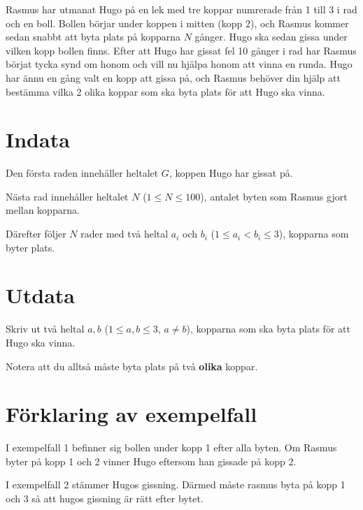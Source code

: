 
Rasmus har utmanat Hugo på en lek med tre koppar numrerade från 1 till 3 i rad och en boll. Bollen börjar under koppen i
mitten (kopp 2), och Rasmus kommer sedan snabbt att byta plats på kopparna $N$ gånger.
Hugo ska sedan gissa under vilken kopp bollen finns. Efter att Hugo har gissat fel 10 gånger i rad
har Rasmus börjat tycka synd om honom och vill nu hjälpa honom att vinna en runda.
Hugo har ännu en gång valt en kopp att gissa på, och Rasmus behöver din hjälp att bestämma vilka
2 olika koppar som ska byta plats för att Hugo ska vinna.

\section*{Indata}
Den första raden innehåller heltalet $G$, koppen Hugo har gissat på.

Nästa rad innehåller heltalet $N$ ($1 \le N \le 100$), antalet byten som Rasmus gjort mellan kopparna.

Därefter följer $N$ rader med två heltal $a_i$ och $b_i$ ($1 \le a_i < b_i \le 3$), kopparna som byter plats.

\section*{Utdata}
Skriv ut två heltal $a,b$ ($1 \leq a,b \leq 3$, $a \neq b$), kopparna som ska byta plats för att Hugo ska vinna.

Notera att du alltså måste byta plats på två \textbf{olika} koppar.

\section*{Förklaring av exempelfall}
I exempelfall 1 befinner sig bollen under kopp 1 efter alla byten. Om Rasmus byter på kopp 1 och 2 vinner
Hugo eftersom han gissade på kopp 2.

I exempelfall 2 stämmer Hugos gissning. Därmed måste rasmus byta på kopp 1 och 3 så att hugos gissning
är rätt efter bytet.
